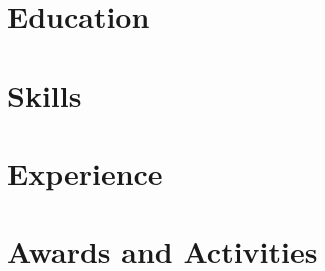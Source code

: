 \documentclass[letter,10pt]{article}
\begin{document}
%
\section{Education}


\section{Skills}


\section{Experience}



% 

\section{Awards and Activities}

\end{document}
